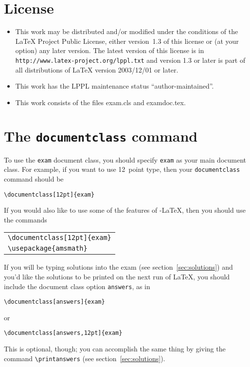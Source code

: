 \documentclass[12pt]{exam}
\begin{document}
\section{License}

\begin{itemize}
\item This work may be distributed and/or modified under the conditions of
  the \LaTeX{} Project Public License, either version~1.3 of this
  license or (at your option) any later version.  The latest version
  of this license is in \verb"http://www.latex-project.org/lppl.txt"
  and version 1.3 or later is part of all distributions of \LaTeX{}
  version 2003/12/01 or later.
\item This work has the LPPL maintenance status
  ``author-maintained''.
\item This work consists of the files exam.cls and examdoc.tex.
\end{itemize}


\section{The \texttt{documentclass} command}

To use the \verb"exam" document class, you should specify \verb"exam"
as your main document class.  For example, if you want to use
12~point type, then your \verb"documentclass" command should be
%
\begin{center}
\verb"\documentclass[12pt]{exam}"
\end{center}
%
If you would also like to use some of the features of \AmS-\LaTeX,
then you should use the commands
%
\begin{center}
  \begin{tabular}{l}
    \verb"\documentclass[12pt]{exam}"\\
    \verb"\usepackage{amsmath}"
  \end{tabular}
\end{center}
%
If you will be typing solutions into the exam (see
section~\ref{sec:solutions}) and you'd like the solutions to be
printed on the next run of \LaTeX, you should include the document
class option \verb"answers", as in
\begin{center}
  \verb"\documentclass[answers]{exam}"
\end{center}
or
\begin{center}
  \verb"\documentclass[answers,12pt]{exam}"
\end{center}
This is optional, though; you can accomplish the same thing by giving
the command \verb"\printanswers" (see section~\ref{sec:solutions}).
\end{document}
